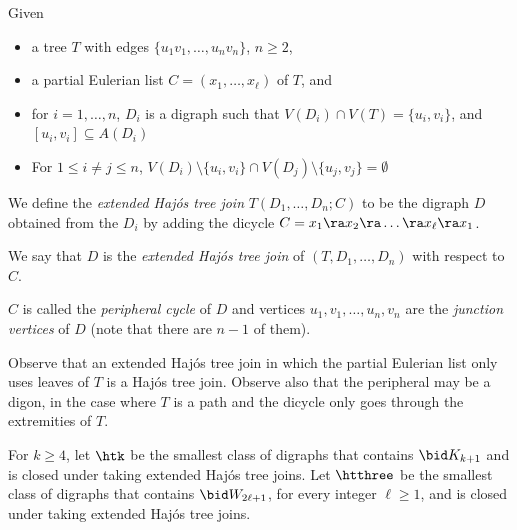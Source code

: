 \begin{definition}\label{def:EHTJ}
Given 
\begin{itemize}
    \item a tree $T$ with edges $\{u_1v_1, \dots, u_nv_n\}$, $n \geq 2$, 
    \item a  partial Eulerian list $C=(x_1, \dots, x_{\ell})$ of $T$,  and
    \item for $i=1, \dots, n$, $D_i$ is a digraph such that $V(D_i) \cap V(T) = \{u_i,v_i\}$, and $[u_i,v_i] \subseteq A(D_i)$
    \item For $1 \leq i \neq j \leq n$, $V(D_i) \setminus \{u_i, v_i\} \cap V(D_j) \setminus \{u_j, v_j\} = \emptyset$ 
\end{itemize}
We define the \emph{extended Haj\'os tree join} $T(D_1, \dots, D_n;C)$ to be the digraph $D$ obtained from the $D_i$ by adding the dicycle $C = x_1 \ra x_2 \ra \dots \ra x_{\ell} \ra x_1$. 

We say that $D$ is the \emph{extended Haj\'os tree join} of $(T, D_1, \dots, D_n)$ with respect to $C$. 

$C$ is called the  \emph{peripheral cycle} of $D$  and vertices $u_1, v_1, \dots, u_n,v_n$ are the \emph{junction vertices} of $D$ (note that there are $n-1$ of them). \\


\end{definition}



Observe that an extended Haj\'os tree join in which the partial Eulerian list only uses leaves of $T$ is a Haj\'os tree join. Observe also that the peripheral may be a digon, in the case where $T$ is a path and the dicycle only goes through the extremities of $T$. 

\begin{definition}
For $k \geq 4$, let $\htk$ be the smallest class of digraphs that contains $\bid K_{k+1}$ and is closed under taking extended Haj\'os tree joins. Let $\htthree$ be the smallest class of digraphs that contains $\bid W_{2\ell+1}$, for every integer $\ell \geq 1$, and is closed under taking extended Haj\'os tree joins.
\end{definition}


